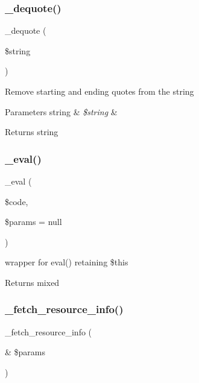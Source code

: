 \subsubsection{\texorpdfstring{\+\_\+dequote()}{\_dequote()}}
{\footnotesize\ttfamily \+\_\+dequote (\begin{DoxyParamCaption}\item[{}]{\$string }\end{DoxyParamCaption})}

Remove starting and ending quotes from the string


\begin{DoxyParams}[1]{Parameters}
string & {\em \$string} & \\
\hline
\end{DoxyParams}
\begin{DoxyReturn}{Returns}
string 
\end{DoxyReturn}
\mbox{\label{class_smarty_a9b47d457e9e3d4d47a696d77dfa43e7f}} 
\subsubsection{\texorpdfstring{\+\_\+eval()}{\_eval()}}
{\footnotesize\ttfamily \+\_\+eval (\begin{DoxyParamCaption}\item[{}]{\$code,  }\item[{}]{\$params = {\ttfamily null} }\end{DoxyParamCaption})}

wrapper for eval() retaining \$this \begin{DoxyReturn}{Returns}
mixed 
\end{DoxyReturn}
\mbox{\label{class_smarty_a0c3ac497dbe0e595d4f2a85f1168a219}} 
\subsubsection{\texorpdfstring{\+\_\+fetch\+\_\+resource\+\_\+info()}{\_fetch\_resource\_info()}}
{\footnotesize\ttfamily \+\_\+fetch\+\_\+resource\+\_\+info (\begin{DoxyParamCaption}\item[{\&}]{\$params }\end{DoxyParamCaption})}

